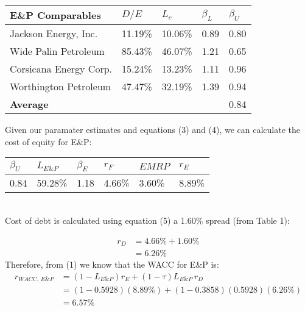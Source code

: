 \documentclass{article}
\begin{document}
\begin{table}[h]
    \centering
    \begin{tabular}{lllll}
    \hline
    \textbf{E\&P Comparables}            & $D/E$     & $L_c$    & $\beta_L$ & $\beta_U$ \\ \hline
    Jackson Energy, Inc.   & 11.19\% & 10.06\% & 0.89    & 0.80    \\
    Wide Palin Petroleum   & 85.43\% & 46.07\% & 1.21    & 0.65    \\
    Corsicana Energy Corp. & 15.24\% & 13.23\% & 1.11    & 0.96    \\
    Worthington Petroleum  & 47.47\% & 32.19\% & 1.39    & 0.94\\\hline
    \textbf{Average}  &  &  &    & 0.84   
    \end{tabular}
    \end{table}
Given our paramater estimates and equations (3) and (4), we can calculate the cost of equity for E\&P:
\begin{table}[h]
    \centering
    \begin{tabular}{llllll}
            \hline
        $\beta_U$ & $L_{E\&P}$ & $\beta_E$ & $r_F$  & $EMRP$ & $r_E$  \\\hline
        0.84      & 59.28\% & 1.18      & 4.66\% & 3.60\% & 8.89\%
    \end{tabular}
    \end{table}\\
Cost of debt is calculated using equation (5) a 1.60\% spread (from Table 1):

\begin{align*}
    r_D&=4.66\%+1.60\%\\
    &=6.26\%
\end{align*}
Therefore, from (1) we know that the WACC for E\&P is:
\begin{align*}
        r_{W\!ACC,\,E\&P} &= (1-L_{E\&P})r_E+(1 - \tau)L_{E\&P}\,r_{D}
        \\&= (1-0.5928)(8.89\%)+(1-0.3858)(0.5928)(6.26\%)
        \\&= 6.57\%
\end{align*}
\pagebreak
\end{document}
